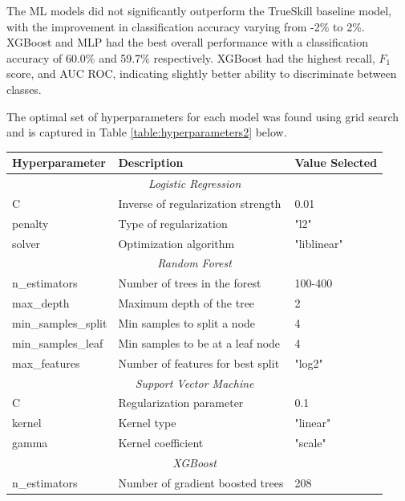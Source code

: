 The ML models did not significantly outperform the TrueSkill baseline model, with the improvement in classification accuracy varying from -2\% to 2\%. XGBoost and MLP had the best overall performance with a classification accuracy of 60.0\% and 59.7\%  respectively. XGBoost had the highest recall, $F_1$ score, and AUC ROC, indicating slightly better ability to discriminate between classes.

The optimal set of hyperparameters for each model was found using grid search and is captured in Table \ref{table:hyperparameters2} below.

 \begin{table}[h]
	\centering
	\small
	\begin{adjustbox}{center}
		\begin{tabular}{|l|l|l|}
			\hline
			\rule{0pt}{2.5ex}\textbf{Hyperparameter} & \textbf{Description} & \textbf{Value Selected} \\
			\hline
			\multicolumn{3}{|c|}{\rule{0pt}{2.5ex}\textit{Logistic Regression}} \\
			\hline
			C & Inverse of regularization strength & 0.01 \\
			penalty & Type of regularization & "l2" \\
			solver & Optimization algorithm & "liblinear" \\
			\hline
			\multicolumn{3}{|c|}{\rule{0pt}{2.5ex}\textit{Random Forest}} \\
			\hline
			n\_estimators & Number of trees in the forest & 100-400 \\
			max\_depth & Maximum depth of the tree & 2 \\
			min\_samples\_split & Min samples to split a node & 4 \\
			min\_samples\_leaf & Min samples to be at a leaf node & 4 \\
			max\_features & Number of features for best split & "log2" \\
			\hline
			\multicolumn{3}{|c|}{\rule{0pt}{2.5ex}\textit{Support Vector Machine}} \\
			\hline
			C & Regularization parameter & 0.1 \\
			kernel & Kernel type & "linear" \\
			gamma & Kernel coefficient & "scale" \\
			\hline
			\multicolumn{3}{|c|}{\rule{0pt}{2.5ex}\textit{XGBoost}} \\
			\hline
			n\_estimators & Number of gradient boosted trees & 208 \\

\end{tabular}
\end{adjustbox}
\end{table}
